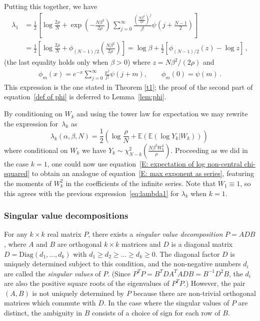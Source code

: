 \documentclass[12pt]{article}
\newcommand{\1}{\mathbf{1}}
\begin{document}
Putting this together, we have 
\begin{equation} \label{E: max exponent as series} 
\begin{split}
\lambda_1 &= \frac{1}{2}\left[ \log \frac{2\rho}{N} +  \exp\left(-\frac{N\beta^2}{2\rho}\right)\,\sum_{j=0}^{\infty}\frac{\left(\frac{N\beta^2}{2\rho} \right)^j}{j!} \psi\left(j + \frac{N-1}{2} \right)\right]
\\ & =\frac{1}{2}\left[ \log \frac{2\rho}{N} +  \phi_{(N-1)/2}\left(\frac{N\beta^2}{2\rho}\right)\right]
=\log \beta+
\frac{1}{2}\left[  \phi_{(N-1)/2}\left(z\right)-\log z\right]
\,,
\end{split}
\end{equation}
(the last equality holds only when $\beta>0$)
where $z=N\beta^2/(2\rho)$ and
\begin{align*}
\phi_m(x)=e^{-x}\sum_{j=0}^\infty\frac{x^j}{j!}\psi(j+m),\qquad \phi_m(0)=\psi(m)\,.
\end{align*}
This expression is the one stated in Theorem \ref{t1}; the proof of the second part of equation~\eqref{def of phi} is deferred to Lemma~\ref{lem:phi}. 


By conditioning on $W_k$ and using the tower law for expectation we may rewrite the expression for~$\lambda_k$ as
$$
\lambda_k(\alpha, \beta,N) = \frac{1}{2}\left(\log \frac{\rho}{N} + \mathbb{E}(\mathbb{E}(\log Y_k | W_k))\right)\, 
$$
where conditional on $W_k$ we have $Y_k\sim \chi^2_{N-k}\!\left(\frac{N\beta^2 W_k^2}{\rho}\right)$.  Proceeding as we did in the case $k=1$, one could now use equation~\eqref{E: expectation of log non-central chi-squared} to obtain an analogue of equation~\eqref{E: max exponent as series}, featuring the moments of $W_k^2$ in the coefficients of the infinite series. 
Note that  $W_1 \equiv 1$, so this agrees with the previous expression~\eqref{eq:lambda1} for $\lambda_k$ when $k=1$.    

\subsubsection{Singular value decompositions}
For any $k\times k$ real matrix $P$, there exists a \emph{singular value decomposition} $P = ADB$, where $A$ and $B$ are orthogonal $k\times k$ matrices and $D$ is a diagonal matrix  $D = \mathrm{Diag}(d_1, \dots, d_k)$ with $d_1 \ge d_2 \ge \dots \ge d_k \ge 0$. The diagonal factor $D$ is uniquely determined subject to this condition, and the non-negative numbers $d_i$ are called the \emph{singular values} of $P$. (Since $P^TP = B^T D A^T A D B = B^{-1}D^2B$, the $d_i$ are also the positive square roots of the eigenvalues of $P^T P$.)   However, the pair $(A, B)$ is not uniquely determined by $P$ because there are non-trivial orthogonal matrices which commute with $D$. In the case where the singular values of $P$ are distinct, the ambiguity in $B$ consists of a choice of sign for each row of $B$.
\end{document}
